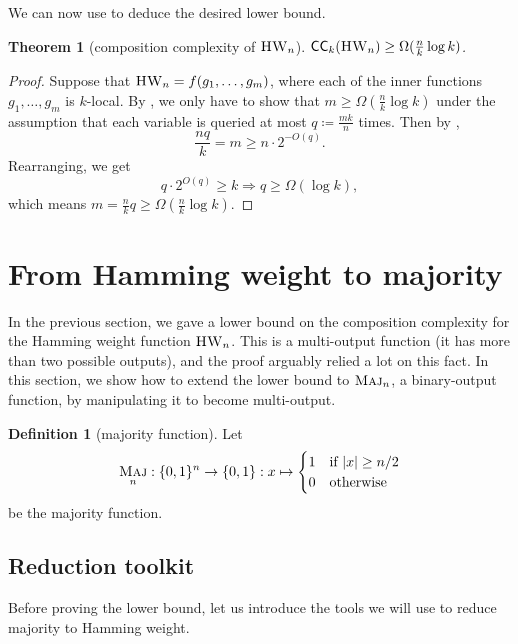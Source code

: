 \documentclass[10pt,a4paper]{article}
\newtheorem{theorem}{Theorem}
\theoremstyle{definition}
\newtheorem{definition}[lemma]{Definition}
\theoremstyle{remark}
\newcommand{\mathsc}[1]{{\normalfont\textsc{#1}}}
\DeclarePairedDelimiter{\set}{\{}{\}}
\DeclareMathOperator{\Maj}{\mathsc{Maj}}
\DeclareMathOperator{\HW}{\mathsc{HW}}
\newcommand{\zo}{\set{0,1}}
\newcommand{\CC}{\mathsf{CC}}
\begin{document}
We can now use  to deduce the desired lower bound.
\begin{theorem}[composition complexity of $\HW_n$]
\label{thm:hamming-weight}
$\CC_k(\HW_n) \geq \Omega(\frac{n}{k}\log k)$.
\end{theorem}
\begin{proof}
Suppose that $\HW_n = f(g_1, \ldots, g_m)$, where each of the inner functions $g_1, \ldots, g_m$ is $k$-local.
By , we only have to show that $m \geq \Omega(\frac{n}{k} \log k)$ under the assumption that each variable is queried at most $q \coloneqq \frac{mk}{n}$ times.
Then by ,
\[
\frac{nq}{k}
= m
\geq n \cdot 2^{-O(q)}.
\]
Rearranging, we get
\[q \cdot 2^{O(q)} \geq k \Rightarrow q \geq \Omega(\log k),\]
which means $m = \frac{n}{k}q \geq \Omega(\frac{n}{k}\log k)$.
\end{proof}


\section{From Hamming weight to majority}
\label{sec:hw-to-maj}

In the previous section, we gave a lower bound on the composition complexity for the Hamming weight function $\HW_n$.
This is a multi-output function (it has more than two possible outputs), and the proof arguably relied a lot on this fact.
In this section, we show how to extend the lower bound to $\Maj_n$, a binary-output function, by manipulating it to become multi-output.

\begin{definition}[majority function]
Let
\[
\Maj_n :\zo^n \to \zo: x \mapsto
\begin{cases}
1 & \text{if $|x| \geq n/2$}\\
0 & \text{otherwise}
\end{cases}
\]
be the majority function.
\end{definition}

\subsection{Reduction toolkit}
Before proving the lower bound, let us introduce the tools we will use to reduce majority to Hamming weight.
\end{document}
